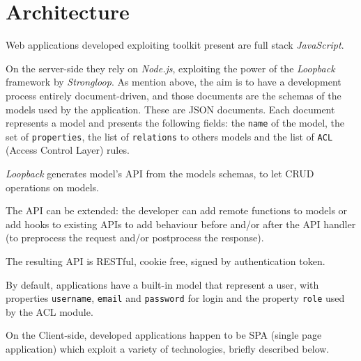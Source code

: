 \section{Architecture}
Web applications developed exploiting  toolkit present are full stack {\em JavaScript}. 

On the server-side they rely on {\em Node.js}, exploiting the power of the {\em Loopback} framework by {\em Strongloop}. As mention above, the aim is to have a development process entirely document-driven, and those documents are the schemas of the models used by the application. These are JSON documents. Each document represents a model and presents the following fields: the \texttt{name} of the model, the set of \texttt{properties}, the list of \texttt{relations} to others models and the list of \texttt{ACL} (Access Control Layer) rules. 

{\em Loopback} generates model’s API from the models schemas, to let CRUD operations on models.

The API can be extended: the developer can add remote functions to models or add hooks to existing APIs to add behaviour before and/or after the API handler (to preprocess the request and/or postprocess the response). 

The resulting API is RESTful, cookie free, signed by authentication token.

By default, applications have a built-in model that represent a user, with properties \texttt{username}, \texttt{email} and \texttt{password} for login and the property \texttt{role} used by the ACL module.


On the Client-side, developed applications happen to be SPA (single page application) which exploit a variety of technologies, briefly described below. 

